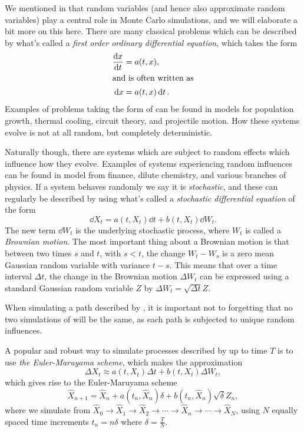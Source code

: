 \documentclass[11pt,a4paper,twoside,english]{extarticle}
\begin{document}
We mentioned in  that random variables (and hence also approximate random variables) play a central role in Monte Carlo simulations, and we will elaborate a bit more on this here. There are many classical problems which can be described by what's called a \emph{first order ordinary differential equation}, which takes the form 
\begin{align}
\dv{x}{t} & = a(t, x), \\
\shortintertext{and is often written as}
\dd{x} & = a(t, x) \dd{t}. \label{eqt:first_order_ode}
\end{align}
Examples of problems taking the form of  can be found in models for population growth, thermal cooling, circuit theory, and projectile motion. How these systems evolve is not at all random, but completely deterministic. 

Naturally though, there are systems which are subject to random effects which influence how they evolve. Examples of systems experiencing random influences can be found in model from finance, dilute chemistry, and various branches of physics. If a system behaves randomly we say it is \emph{stochastic}, and these can regularly be described by using what's called a \emph{stochastic differential equation} of the form
\begin{equation}
\dd{X_t}  = a(t, X_t) \dd{t} + b(t, X_t) \dd{W_t}. \label{eqt:sde}
\end{equation}
The new term $ \dd{W_t} $ is the underlying stochastic process, where $ W_t $ is called a \emph{Brownian motion}. The most important thing about a Brownian motion is that between two times $ s $ and $ t $, with $ s < t $, the change $ W_t - W_s $ is a zero mean Gaussian random variable with variance $ t - s $. This means that over a time interval $ \Delta t $, the change in the  Brownian motion $ \Delta W_t $ can be expressed using a standard Gaussian random variable $ Z $ by $ \Delta W_t = \sqrt{\Delta t} Z $.

When simulating a path described by , it is important not to forgetting that no two simulations of  will be the same, as each path is subjected to unique random influences. 

A popular and robust way to simulate processes described by  up to  time $ T $ is to use \emph{the Euler-Maruyama scheme}, which makes the approximation
\begin{equation}
\Delta X_t \approx  a(t, X_t) \Delta t + b(t, X_t) \Delta W_t, \label{eqt:euler_maruyama_approximation}
\end{equation}
which gives rise to the Euler-Maruyama scheme 
\begin{equation}
\hat{X}_{n+1} = \hat{X}_n +  a(t_n, \hat{X}_n) \delta + b(t_n, \hat{X}_n) \sqrt{\delta} Z_n, \label{eqt:euler_maruyama_scheme}
\end{equation}
where we simulate from $ \hat{X}_0 \to \hat{X}_1 \to \hat{X}_2 \to \cdots \to \hat{X}_n \to \cdots \to \hat{X}_N $, using $ N $ equally spaced time increments $ t_n = n \delta $ where $ \delta = \tfrac{T}{N}$. 
\end{document}
